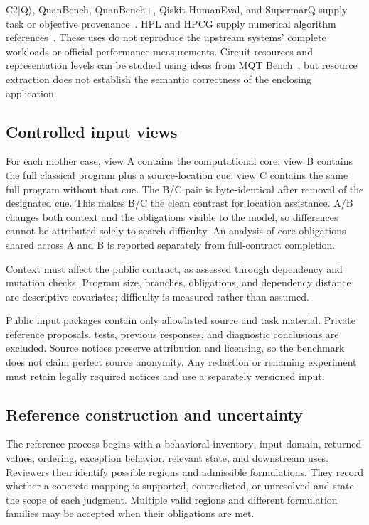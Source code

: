 C2$|$Q$\rangle$, QuanBench, QuanBench+, Qiskit HumanEval, and SupermarQ supply
task or objective provenance~\cite{c2q,quanbench,quanplus,qhe,supermarq}.
HPL and HPCG supply numerical algorithm references~\cite{hpl,hpcg}.
These uses do not reproduce the upstream systems' complete workloads or official
performance measurements. Circuit resources and representation levels can be
studied using ideas from MQT Bench~\cite{mqt}, but resource extraction does not
establish the semantic correctness of the enclosing application.

\subsection{Controlled input views}
For each mother case, view A contains the computational core; view B contains
the full classical program plus a source-location cue; view C contains the same
full program without that cue. The B/C pair is byte-identical after removal of
the designated cue. This makes B/C the clean contrast for location assistance.
A/B changes both context and the obligations visible to the model, so differences
cannot be attributed solely to search difficulty. An analysis of core obligations
shared across A and B is reported separately from full-contract completion.

Context must affect the public contract, as assessed through dependency and
mutation checks. Program size, branches, obligations, and dependency distance are
descriptive covariates; difficulty is measured rather than assumed.

Public input packages contain only allowlisted source and task material. Private
reference proposals, tests, previous responses, and diagnostic conclusions are
excluded. Source notices preserve attribution and licensing, so the benchmark
does not claim perfect source anonymity. Any redaction or renaming experiment
must retain legally required notices and use a separately versioned input.

\subsection{Reference construction and uncertainty}
The reference process begins with a behavioral inventory: input domain, returned
values, ordering, exception behavior, relevant state, and downstream uses. Reviewers
then identify possible regions and admissible formulations. They record whether
a concrete mapping is supported, contradicted, or unresolved and state the scope
of each judgment. Multiple valid regions and different formulation families may
be accepted when their obligations are met.

